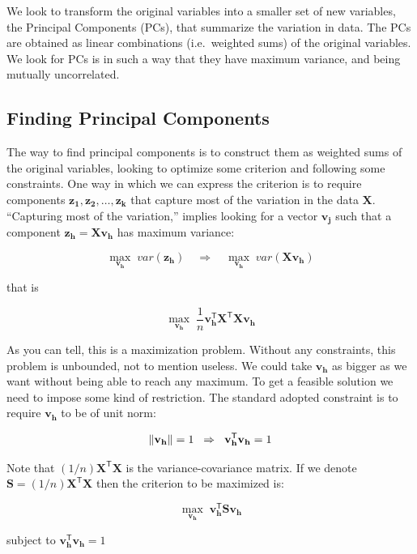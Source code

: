 \documentclass[]{book}
\begin{document}
We look to transform the original variables into a smaller set of new variables,
the Principal Components (PCs), that summarize the variation in data.
The PCs are obtained as linear combinations (i.e.~weighted sums) of the
original variables. We look for PCs is in such a way that they have maximum
variance, and being mutually uncorrelated.

\hypertarget{finding-principal-components}{%
\subsection{Finding Principal Components}\label{finding-principal-components}}

The way to find principal components is to construct them as weighted sums of
the original variables, looking to optimize some criterion and following some
constraints. One way in which we can express the criterion is to require components
\(\mathbf{z_1}, \mathbf{z_2}, \dots, \mathbf{z_k}\) that capture most of the variation
in the data \(\mathbf{X}\). ``Capturing most of the variation,'' implies looking
for a vector \(\mathbf{v_j}\) such that a component \(\mathbf{z_h} = \mathbf{X v_h}\)
has maximum variance:

\[
\max_{\mathbf{v_h}} \; var(\mathbf{z_h}) \quad \Rightarrow \quad \max_{\mathbf{v_h}} \; var(\mathbf{X v_h})
\]

that is

\[
\max_{\mathbf{v_h}} \; \frac{1}{n} \mathbf{v_{h}^\mathsf{T} X^\mathsf{T} X v_h}
\]

As you can tell, this is a maximization problem. Without any constraints, this
problem is unbounded, not to mention useless. We could take \(\mathbf{v_h}\) as
bigger as we want without being able to reach any maximum. To get a feasible
solution we need to impose some kind of restriction. The standard adopted
constraint is to require \(\mathbf{v_h}\) to be of unit norm:

\[
\| \mathbf{v_h} \| = 1 \; \hspace{1mm} \Rightarrow \; \hspace{1mm} \mathbf{v_{h}^\mathsf{T} v_h} = 1 
\]

Note that \((1/n) \mathbf{X^\mathsf{T} X}\) is the variance-covariance matrix.
If we denote \(\mathbf{S} = (1/n) \mathbf{X^\mathsf{T} X}\) then the criterion to
be maximized is:

\[
\max_{\mathbf{v_h}} \; \mathbf{v_{h}^\mathsf{T} S v_h}
\]

subject to \(\mathbf{v_{h}^\mathsf{T} v_h} = 1\)
\end{document}
